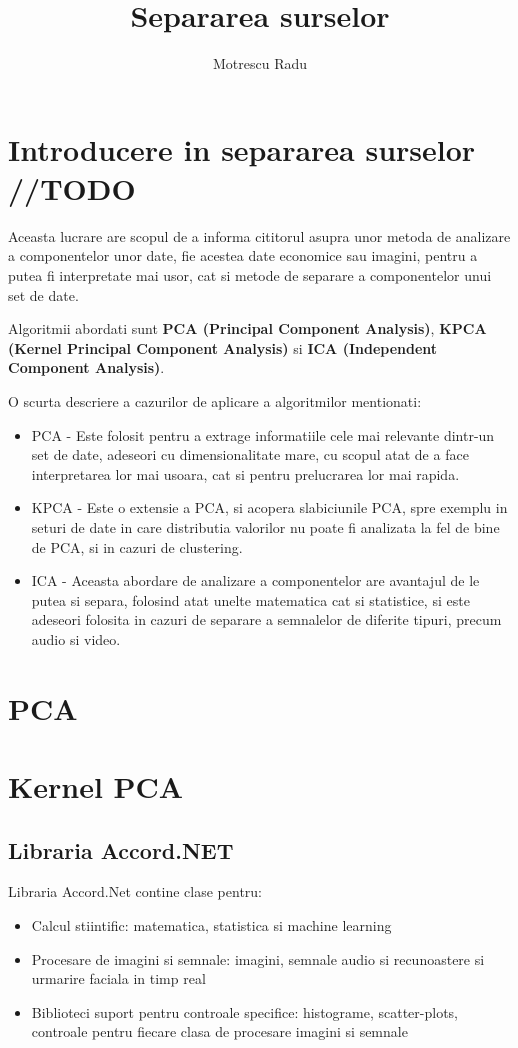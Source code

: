 \documentclass[12pt]{article}
\title{Separarea surselor}
\author{Motrescu Radu}
\date{}
\begin{document}
\maketitle

\newpage

\tableofcontents

\newpage

\section{Introducere in separarea surselor //TODO}
Aceasta lucrare are scopul de a informa cititorul asupra unor metoda de analizare a componentelor unor date, fie acestea date economice sau imagini, pentru a putea fi interpretate mai usor, cat si metode de separare a componentelor unui set de date. 

Algoritmii abordati sunt \textbf{PCA (Principal Component Analysis)}, \textbf{KPCA (Kernel Principal Component Analysis)} si \textbf{ICA (Independent Component Analysis)}. 

O scurta descriere a cazurilor de aplicare a algoritmilor mentionati:
\begin{itemize}
	\item{PCA - Este folosit pentru a extrage informatiile cele mai relevante dintr-un set de date, adeseori cu dimensionalitate mare, cu scopul atat de a face interpretarea lor mai usoara, cat si pentru prelucrarea lor mai rapida.}
	\item{KPCA - Este o extensie a PCA, si acopera slabiciunile PCA, spre exemplu in seturi de date in care distributia valorilor nu poate fi analizata la fel de bine de PCA, si in cazuri de clustering.}
	\item{ICA - Aceasta abordare de analizare a componentelor are avantajul de le putea si separa, folosind atat unelte matematica cat si statistice, si este adeseori folosita in cazuri de separare a semnalelor de diferite tipuri, precum audio si video.}
\end{itemize}
\newpage
\section{PCA}
\section{Kernel PCA}
\subsection{Libraria Accord.NET}
Libraria Accord.Net contine clase pentru:
\begin{itemize}
\item Calcul stiintific: matematica, statistica si machine learning
\item Procesare de imagini si semnale: imagini, semnale audio si recunoastere si urmarire faciala in timp real
\item Biblioteci suport pentru controale specifice: histograme, scatter-plots, controale pentru fiecare clasa de procesare imagini si semnale
\end{itemize}
\end{document}
